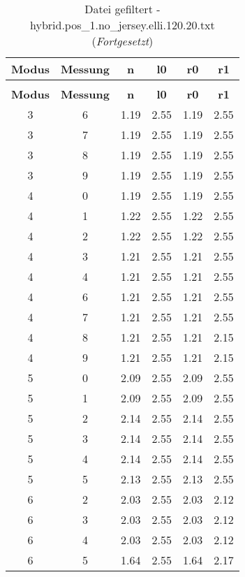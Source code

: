 \begin{longtable}{|c|c||c||c||c|c|}
	\caption{Datei gefiltert - hybrid.pos\_1.no\_jersey.elli.120.20.txt} \label{tab:hybrid.pos-1.no-jersey.elli.120.20.txt} \\ \hline
	\textbf{Modus} & \textbf{Messung} & \textbf{n} & \textbf{l0} & \textbf{r0} & \textbf{r1}\\ \hline
	\endfirsthead
	\caption[]{Datei gefiltert - hybrid.pos\_1.no\_jersey.elli.120.20.txt (\emph{Fortgesetzt})} \\ \hline
	\textbf{Modus} & \textbf{Messung} & \textbf{n} & \textbf{l0} & \textbf{r0} & \textbf{r1}\\ \hline
	\endhead
	3 & 6 & 1.19 & 2.55 & 1.19 & 2.55 \\ \hline
	3 & 7 & 1.19 & 2.55 & 1.19 & 2.55 \\ \hline
	3 & 8 & 1.19 & 2.55 & 1.19 & 2.55 \\ \hline
	3 & 9 & 1.19 & 2.55 & 1.19 & 2.55 \\ \hline
	4 & 0 & 1.19 & 2.55 & 1.19 & 2.55 \\ \hline
	4 & 1 & 1.22 & 2.55 & 1.22 & 2.55 \\ \hline
	4 & 2 & 1.22 & 2.55 & 1.22 & 2.55 \\ \hline
	4 & 3 & 1.21 & 2.55 & 1.21 & 2.55 \\ \hline
	4 & 4 & 1.21 & 2.55 & 1.21 & 2.55 \\ \hline
	4 & 6 & 1.21 & 2.55 & 1.21 & 2.55 \\ \hline
	4 & 7 & 1.21 & 2.55 & 1.21 & 2.55 \\ \hline
	4 & 8 & 1.21 & 2.55 & 1.21 & 2.15 \\ \hline
	4 & 9 & 1.21 & 2.55 & 1.21 & 2.15 \\ \hline
	5 & 0 & 2.09 & 2.55 & 2.09 & 2.55 \\ \hline
	5 & 1 & 2.09 & 2.55 & 2.09 & 2.55 \\ \hline
	5 & 2 & 2.14 & 2.55 & 2.14 & 2.55 \\ \hline
	5 & 3 & 2.14 & 2.55 & 2.14 & 2.55 \\ \hline
	5 & 4 & 2.14 & 2.55 & 2.14 & 2.55 \\ \hline
	5 & 5 & 2.13 & 2.55 & 2.13 & 2.55 \\ \hline
	6 & 2 & 2.03 & 2.55 & 2.03 & 2.12 \\ \hline
	6 & 3 & 2.03 & 2.55 & 2.03 & 2.12 \\ \hline
	6 & 4 & 2.03 & 2.55 & 2.03 & 2.12 \\ \hline
	6 & 5 & 1.64 & 2.55 & 1.64 & 2.17 \\ \hline

\end{longtable}
